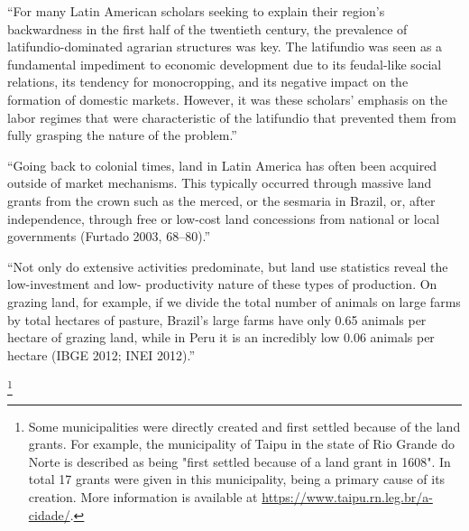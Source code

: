 \documentclass{article}
\begin{document}



\parencite{Carlson2019-mk}
``For many Latin American scholars seeking to explain their region’s backwardness in the first half of the  twentieth century, the prevalence of latifundio-dominated agrarian structures was key. The latifundio was  seen  as a  fundamental  impediment  to  economic  development  due  to  its  feudal-like  social  relations,  its   tendency for monocropping, and its negative impact on the formation of domestic markets. However, it  was these scholars’ emphasis on the labor regimes that were characteristic of the latifundio that prevented  them from fully grasping the nature of the problem.''

\parencite{Carlson2019-mk}
``Going back to colonial times, land in Latin America has often been acquired outside of market mechanisms.  This typically occurred through massive land grants from the crown such as the merced, or the sesmaria in  Brazil, or, after independence, through free or low-cost land concessions from national or local governments  (Furtado  2003,  68–80).''

\parencite{Carlson2019-mk}
``Not only do extensive activities predominate, but land use statistics reveal the low-investment and low- productivity nature of these types of production. On grazing land, for example, if we divide the total number  of animals on large farms by total hectares of pasture, Brazil’s large farms have only 0.65 animals per hectare  of grazing land, while in Peru it is an incredibly low 0.06 animals per hectare (IBGE 2012; INEI 2012).''


\footnote{Some municipalities were directly created and first settled because of the land grants. For example, the municipality of Taipu in the state of Rio Grande do Norte is described as being "first settled because of a land grant in 1608". In total 17 grants were given in this municipality, being a primary cause of its creation. More information is available at \url{https://www.taipu.rn.leg.br/a-cidade/}.}
\end{document}
